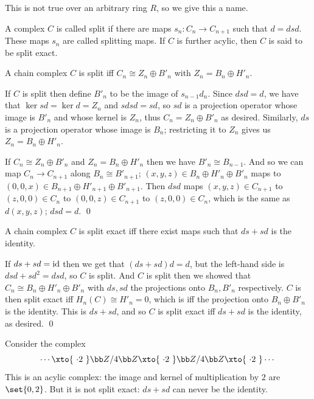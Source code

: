 This is not true over an arbitrary ring $R$, so we give this a name.

\bdefn

    A complex $C$ is called {\emphcolor split} if there are maps $s_n\colon C_n\to C_{n+1}$ such that $d=dsd$.
    These maps $s_n$ are called {\emphcolor splitting maps}.
    If $C$ is further acylic, then $C$ is said to be {\emphcolor split exact}.

\edefn

\bprop

    A chain complex $C$ is split iff $C_n\cong Z_n\oplus B'_n$ with $Z_n=B_n\oplus H'_n$.

\eprop

\bproof

    If $C$ is split then define $B'_n$ to be the image of $s_{n-1}d_n$.
    Since $dsd=d$, we have that $\ker sd=\ker d=Z_n$ and $sdsd=sd$, so $sd$ is a projection operator whose image is $B'_n$ and whose kernel is $Z_n$, thus $C_n=Z_n\oplus B'_n$ as desired.
    Similarly, $ds$ is a projection operator whose image is $B_n$; restricting it to $Z_n$ gives us $Z_n=B_n\oplus H'_n$.

    If $C_n\cong Z_n\oplus B'_n$ and $Z_n=B_n\oplus H'_n$ then we have $B'_n\cong B_{n-1}$.
    And so we can map $C_n\to C_{n+1}$ along $B_n\cong B'_{n+1}$; $(x,y,z)\in B_n\oplus H'_n\oplus B'_n$ maps to $(0,0,x)\in B_{n+1}\oplus H'_{n+1}\oplus B'_{n+1}$.
    Then $dsd$ maps $(x,y,z)\in C_{n+1}$ to $(z,0,0)\in C_n$ to $(0,0,z)\in C_{n+1}$ to $(z,0,0)\in C_n$, which is the same as $d(x,y,z)$; $dsd=d$.
    \qed

\eproof

\bprop

    A chain complex $C$ is split exact iff there exist maps such that $ds+sd$ is the identity.

\eprop

\bproof

    If $ds+sd={\rm id}$ then we get that $(ds+sd)d=d$, but the left-hand side is $dsd+sd^2=dsd$, so $C$ is split.
    And $C$ is split then we showed that $C_n\cong B_n\oplus H'_n\oplus B'_n$ with $ds,sd$ the projections onto $B_n,B'_n$ respectively.
    $C$ is then split exact iff $H_n(C)\cong H'_n=0$, which is iff the projection onto $B_n\oplus B'_n$ is the identity.
    This is $ds+sd$, and so $C$ is split exact iff $ds+sd$ is the identity, as desired.
    \qed

\eproof

\bexam

    Consider the complex
    $$ \cdots\xto{\ \cdot2\ }\bZ/4\bZ\xto{\ \cdot2\ }\bZ/4\bZ\xto{\ \cdot2\ }\cdots $$
    This is an acylic complex: the image and kernel of multiplication by $2$ are $\set{0,2}$.
    But it is not split exact: $ds+sd$ can never be the identity.


